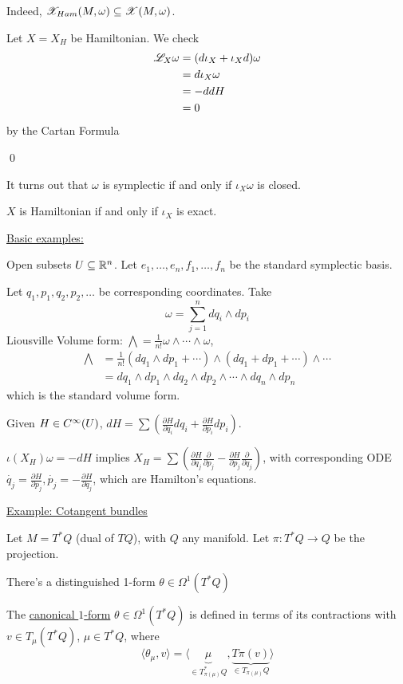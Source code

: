 \documentclass[x11names,reqno,14pt]{extarticle}
\newcommand{\pp}[2]{\frac{\partial #1}{\partial #2}}
\begin{document}
\prop Indeed, $\mathscr{X}_{Ham}(M,\omega) \subseteq \mathscr{X}(M,\omega)$.

\proof

Let $X = X_H$ be Hamiltonian. We check 
\begin{align*}
\mathscr{L}_X\omega & = (d\iota_X + \iota_Xd)\omega \\
& = d\iota_X\omega \\ 
& = -ddH \\
& = 0\\
\end{align*}
by the Cartan Formula

\qed

It turns out that $\omega$ is symplectic if and only if $\iota_X\omega$ is closed. 

$X$ is Hamiltonian if and only if $\iota_X$ is exact. 

\underline{Basic examples:} 

Open subsets $U \subseteq \mathbb{R}^n$. Let $e_1, \dots, e_n, f_1, \dots, f_n$ be the standard symplectic basis. 

Let $q_1, p_1, q_2, p_2, \dots$ be corresponding coordinates. Take \[
\omega = \sum_{j=1}^ndq_i\wedge dp_i
\]
Liousville Volume form: $\bigwedge= \frac{1}{n!}\omega\wedge\cdots\wedge\omega$, 
\begin{align*}
\bigwedge & =\frac{1}{n!}(dq_1\wedge dp_1 + \cdots)\wedge(dq_1 + dp_1 + \cdots)\wedge \cdots \\
& = dq_1 \wedge dp_1 \wedge dq_2 \wedge dp_2 \wedge\cdots\wedge dq_n \wedge dp_n
\end{align*}
which is the standard volume form. 

Given $H \in C^\infty(U)$, $dH = \sum(\pp{H}{q_i}dq_i + \pp{H}{p_i}dp_i)$. 

$\iota(X_H)\omega = -dH$ implies $X_H = \sum(\pp{H}{q_j}\pp{}{p_j} - \pp{H}{p_j}\pp{}{q_j})$, with corresponding ODE $\dot{q_j} = \pp{H}{p_j}, \dot{p_j} = -\pp{H}{q_j}$, which are Hamilton's equations. 

\underline{Example: Cotangent bundles}

Let $M = T^*Q$ (dual of $TQ$), with $Q$ any manifold. Let $\pi:T^*Q\to Q$ be the projection. 

There's a distinguished 1-form $\theta \in \Omega^1(T^*Q)$


The \underline{canonical $1$-form} $\theta \in \Omega^1(T^*Q)$ is defined in terms of its contractions with $v \in T_{\mu}(T^*Q)$, $\mu \in T^*Q$, where
\[
\langle \theta_\mu, v\rangle = \langle \underbrace{\mu}_{\in T_{\pi(\mu)}^*Q}, \underbrace{T\pi(v)}_{\in T_{\pi(\mu)}Q} \rangle
\]
\end{document}

